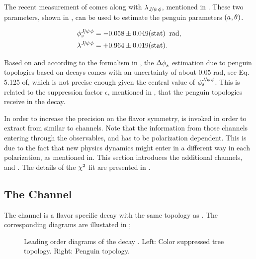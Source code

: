 The recent \lhcb measurement\cite{phis-3fb-paper} of \phis comes along with $\lambda_{{J\mskip -3mu/\mskip -2mu\psi\mskip 2mu}\phi}$, mentioned in .
These two parameters, shown in , can be used to estimate the penguin parameters $(a_{},\theta_{})$.

\begin{subequations}
  \label{phis_lambda_result}
  \begin{align}
    \centering
    \phis^{\jpsi\phi}     &=  -0.058 \pm 0.049(\text{stat})  \;\; \text{rad},\\
    \lambda^{\jpsi\phi}   &=  +0.964 \pm 0.019(\text{stat}).
  \end{align}
\end{subequations}

\noindent Based on  and according to the formalism in , the $\Delta\phi_{s}^{}$ estimation
due to penguin topologies based on \BsJpsiPhi decays comes with an uncertainty of about $0.05$ rad, see Eq. 5.125 of\cite{DeBruyn-thesis}, which is not precise
enough given the central value of $\phi_{s}^{{J\mskip -3mu/\mskip -2mu\psi\mskip 2mu}\phi}$. This is related to the suppression factor $\epsilon$, mentioned in
, that the penguin topologies receive in the \BsJpsiPhi decay.

In order to increase the precision on \DeltaPhis{} the \grpsuthree flavor symmetry,
is invoked in order to extract \DeltaPhis{} from similar to \BsJpsiPhi channels.
Note that the information from those channels entering through the observables,  and 
has to be polarization dependent. This is due to the fact that new physics dynamics might enter in a different way in each polarization,
as mentioned in\cite{DeBruyn-thesis}.
This section introduces the additional channels, \BsJpsiKst and \BdJpsiRho. The details of the $\chi^2$ fit are presented in .


\subsection{The \BsJpsiKst Channel}
\label{bsjpsikst_chanell}

The \BsJpsiKst channel is a flavor specific decay with the same topology as \BsJpsiPhi. The corresponding
diagrams are illustated in ;

\begin{figure}[h]
  \centering
  \scalebox{0.9}{\sffamily }
  \caption{Leading order diagrams of the decay \BsJpsiKst. Left: Color suppressed tree topology. Right: Penguin topology.}
  \label{bs2jpsikst}
\end{figure}

